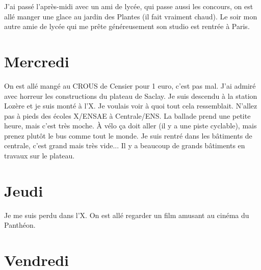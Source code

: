 \documentclass[french,a4paper, 12pt]{article}
\begin{document}
J'ai passé l'après-midi avec un ami de lycée, qui passe aussi les concours, on est allé manger une glace au jardin des Plantes (il fait vraiment chaud). Le soir mon autre amie de lycée qui me prête généreusement son studio est rentrée à Paris.

\section*{Mercredi}

On est allé mangé au CROUS de Censier pour 1 euro, c'est pas mal. J'ai admiré avec horreur les constructions du plateau de Saclay. Je suis descendu à la station Lozère et je suis monté à l'X. Je voulais voir à quoi tout cela ressemblait. N'allez pas à pieds des écoles X/ENSAE à Centrale/ENS. La ballade prend une petite heure, mais c'est très moche. À vélo ça doit aller (il y a une piste cyclable), mais prenez plutôt le bus comme tout le monde. Je suis rentré dans les bâtiments de centrale, c'est grand mais très vide... Il y a beaucoup de grands bâtiments en travaux sur le plateau. 

\section*{Jeudi}

Je me suis perdu dans l'X. On est allé regarder un film amusant au cinéma du Panthéon.

\section*{Vendredi}
\end{document}

